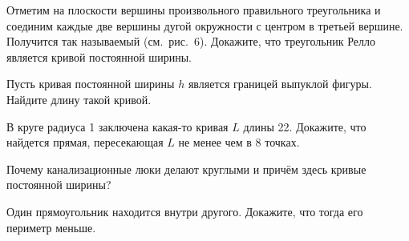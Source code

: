 \documentclass[a4paper,10pt]{article}
\begin{document}
Отметим на плоскости вершины произвольного правильного треугольника
и соединим каждые две вершины дугой окружности с центром в третьей
вершине. Получится так называемый 
(см.~рис.~6). Докажите, что треугольник Релло
является кривой постоянной ширины.



Пусть кривая постоянной ширины $h$ является границей выпуклой фигуры.
Найдите длину такой кривой.


В круге радиуса 1 заключена какая-то кривая $L$ длины 22. Докажите, что
найдется прямая, пересекающая $L$ не менее чем в 8 точках.


Почему канализационные люки делают круглыми и причём здесь кривые постоянной ширины?

Один прямоугольник находится внутри другого. Докажите, что тогда его периметр меньше.


\end{document}
